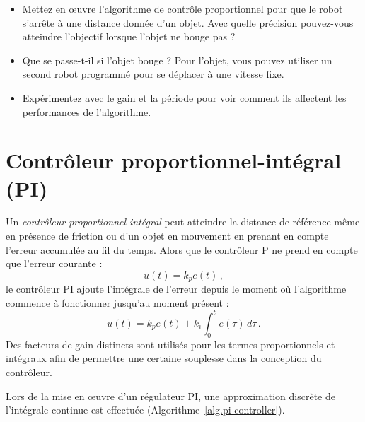 \begin{framed}
\begin{itemize}
\item Mettez en œuvre l'algorithme de contrôle proportionnel pour que le robot s'arrête à une distance donnée d'un objet. Avec quelle précision pouvez-vous atteindre l'objectif lorsque l'objet ne bouge pas ?
\item Que se passe-t-il si l'objet bouge ? Pour l'objet, vous pouvez utiliser un second robot programmé pour se déplacer à une vitesse fixe.
\item Expérimentez avec le gain et la période pour voir comment ils affectent les performances de l'algorithme.
\end{itemize}
\end{framed}

\section{Contrôleur proportionnel-intégral (PI)}\label{s.pi}

Un \emph{contrôleur proportionnel-intégral} peut atteindre la distance de référence même en présence de friction ou d'un objet en mouvement en prenant en compte l'erreur accumulée au fil du temps. Alors que le contrôleur P ne prend en compte que l'erreur courante :
\[
u(t) = k_pe(t)\,,
\]
le contrôleur PI ajoute l'intégrale de l'erreur depuis le moment où l'algorithme commence à fonctionner jusqu'au moment présent :
\[
u(t) = k_pe(t) + k_i\int_{0}^t e(\tau)\,d\tau\,.
\]
Des facteurs de gain distincts sont utilisés pour les termes proportionnels et intégraux afin de permettre une certaine souplesse dans la conception du contrôleur.

Lors de la mise en œuvre d'un régulateur PI, une approximation discrète de l'intégrale continue est effectuée (Algorithme~\ref{alg.pi-controller}).

